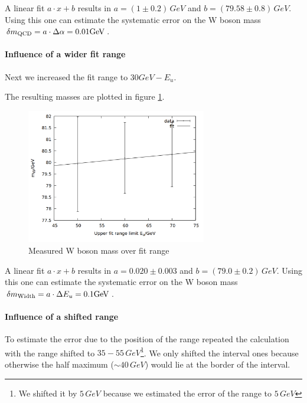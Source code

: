 A linear fit $a\cdot x + b$ results in $a = (1 \pm 0.2)\,\si{GeV}$ and $b = (79.58 \pm 0.8) \, \si{GeV}$. Using this one can estimate the systematic error on the W boson mass $\delta m\ind{QCD} = a \cdot \Delta\alpha = 0.01 \si{GeV}$. 

\paragraph{Influence of a wider fit range}

Next we increased the fit range to $30 \si{GeV} - E_u$.  

The resulting masses are plotted in figure \ref{fig:task3_range}.

\begin{figure}
\centering
\includegraphics[width=0.7\textwidth]{data/range.png}
\caption{Measured W boson mass over fit range}
\label{fig:task3_range}
\end{figure}

A linear fit $a\cdot x + b$ results in $a = 0.020 \pm 0.003$ and $b = (79.0 \pm 0.2) \,\si{GeV}$. Using this one can estimate the systematic error on the W boson mass $\delta m\ind{Width} = a \cdot \Delta E_u = 0.1 \si{GeV}$. 

\paragraph{Influence of a shifted range}
To estimate the error due to the position of the range repeated the calculation with the range shifted to $35 - 55\,\si{GeV}$\footnote{We shifted it by $5\,\si{GeV}$ because we estimated the error of the range to $5\,\si{GeV}$}. We only shifted the interval ones because otherwise the half maximum ($\sim 40\,\si{GeV}$) would lie at the border of the interval.\\

